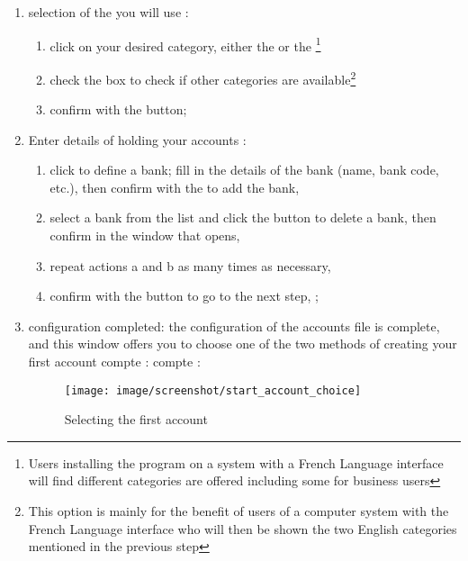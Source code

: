 \begin{enumerate}
\item selection of the   you will use :
\begin{enumerate} 
 \item click on your desired category, either the  or the  \footnote{ Users installing the program on a system with a French Language interface will find different categories are offered including some for business users} 
\item check the  box to check if other categories are available\footnote{ This option is mainly for the benefit of users of a computer system with the French Language interface who will then be shown the two English categories mentioned in the previous step}
\item confirm with the  button;
\end{enumerate}

\item Enter details of  holding your accounts :
\begin{enumerate} 
 \item click   to define a bank; fill in the details of the bank (name, bank code, etc.), then confirm with the  to add the bank,
\item select a bank from the list and click the  button to delete a bank, then confirm in the window that opens,
\item repeat actions a and b as many times as necessary,
\item  confirm with the   button to go to the next step,  ;
\end{enumerate} 

\item configuration completed: the configuration of the accounts file is complete, and this window offers you to choose one of the two methods of creating your first account
\ifIllustration compte :
\else compte :
\fi

\ifIllustration
\begin{figure}[ht]
\begin{center}
\texttt{[image: image/screenshot/start\_account\_choice]}
\end{center}
\caption{Selecting the first account}
\label{start-account-choice-img}
\end{figure}
\fi


\end{enumerate}
